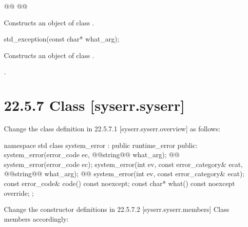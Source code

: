 \documentclass[ebook,11pt,article]{memoir}
\begin{document}
\begin{itemdecl}
@@
@@
\end{itemdecl}

\begin{itemdescr}
\pnum
\effects
Constructs an object of class
\emph{}.

\pnum
\postconditions
{}
\end{itemdescr}

\begin{removedblock}
\begin{itemdecl}
std_exception(const char* what_arg);
\end{itemdecl}

\begin{itemdescr}
\pnum
\effects
Constructs an object of class
.

\pnum
\postconditions
{}.
\end{itemdescr}
\end{removedblock}


\section{22.5.7 {Class } [syserr.syserr]}
Change the class definition in 22.5.7.1 [syserr.syserr.overview] as follows:
%
\begin{codeblock}
namespace std {
  class system_error : public runtime_error {
  public:
    system_error(error_code ec, @@string@\removed{\&}@ what_arg);
    @@
    system_error(error_code ec);
    system_error(int ev, const error_category& ecat, @@string@\removed{\&}@ what_arg);
    @@
    system_error(int ev, const error_category& ecat);
    const error_code& code() const noexcept;
    const char* what() const noexcept override;
  };
}
\end{codeblock}

Change the constructor definitions in 22.5.7.2 [syserr.syserr.members] {Class  members} 
accordingly:
\end{document}
